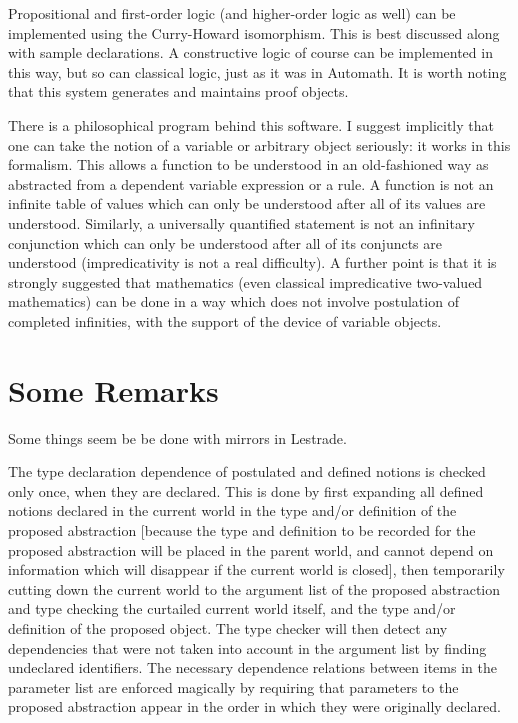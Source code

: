 Propositional and first-order logic (and higher-order logic as well) can be implemented using the Curry-Howard isomorphism.  This is best discussed along with sample declarations.   A constructive logic of course can be implemented in this way, but so can classical logic, just as it was in Automath.  It is worth noting that this system generates and maintains proof objects.

There is a philosophical program behind this software.  I suggest implicitly that one can take the notion of a variable or arbitrary object seriously:  it works in this formalism.  This allows a function to be understood in an old-fashioned way as abstracted from a dependent variable expression or a rule.  A function is not an infinite table of values which can only be understood after all of its values are understood.   Similarly, a universally quantified statement is not an infinitary conjunction which can only be understood after all of its conjuncts are understood (impredicativity is not a real difficulty).  A further point is that it is strongly suggested that mathematics (even classical impredicative two-valued mathematics) can be done in a way which does not involve postulation of completed infinities, with the support of the device of variable objects.

\section{Some Remarks}

Some things seem be be done with mirrors in Lestrade.   

The type declaration dependence of postulated and defined notions is checked only once, when they are declared.   This is done by first expanding all defined notions declared in the current world in the type and/or definition of the proposed abstraction [because the type and definition to be recorded for the proposed abstraction will be placed in the parent world, and cannot depend on information which will disappear if the current world is closed], then temporarily cutting down the current world to the argument list of the proposed
abstraction and type checking the curtailed current world itself, and the type and/or definition of the proposed object.   The type checker will then detect any dependencies that were not taken into account in the argument list by finding undeclared identifiers.  The necessary dependence relations between items in the parameter list are enforced magically by requiring that parameters to the proposed abstraction appear in the order in which they were originally declared.

